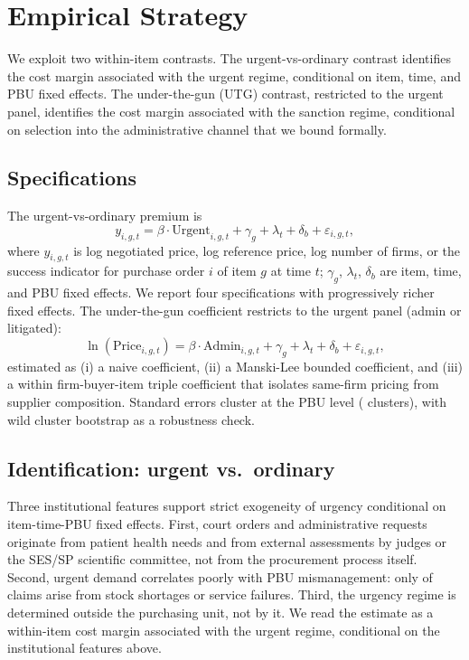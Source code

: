 \section{Empirical Strategy}
\label{sec:empirical}

We exploit two within-item contrasts. The urgent-vs-ordinary contrast
identifies the cost margin associated with the urgent regime,
conditional on item, time, and PBU fixed effects. The
under-the-gun (UTG) contrast, restricted to the urgent panel,
identifies the cost margin associated with the sanction regime,
conditional on selection into the administrative channel that we
bound formally.

\subsection{Specifications}

The urgent-vs-ordinary premium is
\begin{equation}
\label{eq:baseline}
y_{i,g,t} = \beta \cdot \text{Urgent}_{i,g,t} + \gamma_g + \lambda_t + \delta_b + \varepsilon_{i,g,t},
\end{equation}
where $y_{i,g,t}$ is log negotiated price, log reference price, log
number of firms, or the success indicator for purchase order $i$ of
item $g$ at time $t$; $\gamma_g$, $\lambda_t$, $\delta_b$ are item,
time, and PBU fixed effects. We report four specifications with
progressively richer fixed effects. The under-the-gun coefficient
restricts to the urgent panel (admin or litigated):
\begin{equation}
\label{eq:utg}
\ln(\text{Price}_{i,g,t}) = \beta \cdot \text{Admin}_{i,g,t} + \gamma_g + \lambda_t + \delta_b + \varepsilon_{i,g,t},
\end{equation}
estimated as (i) a naive coefficient, (ii) a Manski-Lee bounded
coefficient, and (iii) a within firm-buyer-item triple coefficient
that isolates same-firm pricing from supplier composition. Standard
errors cluster at the PBU level (\BPpbuCount{} clusters), with wild
cluster bootstrap as a robustness check.

\subsection{Identification: urgent vs.\ ordinary}

Three institutional features support strict exogeneity of urgency
conditional on item-time-PBU fixed effects. First, court orders and
administrative requests originate from patient health needs and from
external assessments by judges or the SES/SP scientific committee,
not from the procurement process itself. Second, urgent demand
correlates poorly with PBU mismanagement: only
\BPstockShortageShare{} of claims arise from stock shortages or
service failures. Third, the urgency regime is determined outside the
purchasing unit, not by it. We read the estimate as a within-item
cost margin associated with the urgent regime, conditional on the
institutional features above.

